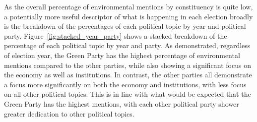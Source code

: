 \documentclass[preprint,12pt,authoryear]{elsarticle}
\begin{document}
As the overall percentage of environmental mentions by constituency is quite low, a potentially more useful descriptor of what is happening in each election broadly is the breakdown of the percentages of each political topic by year and political party. Figure~\ref{fig:stacked_year_party} shows a stacked breakdown of the percentage of each political topic by year and party. As demonstrated, regardless of election year, the Green Party has the highest percentage of environmental mentions compared to the other parties, while also showing a significant focus on the economy as well as institutions. In contrast, the other parties all demonstrate a focus more significantly on both the economy and institutions, with less focus on all other political topics. This is in line with what would be expected that the Green Party has the highest mentions, with each other political party shower greater dedication to other political topics.


\end{document}
